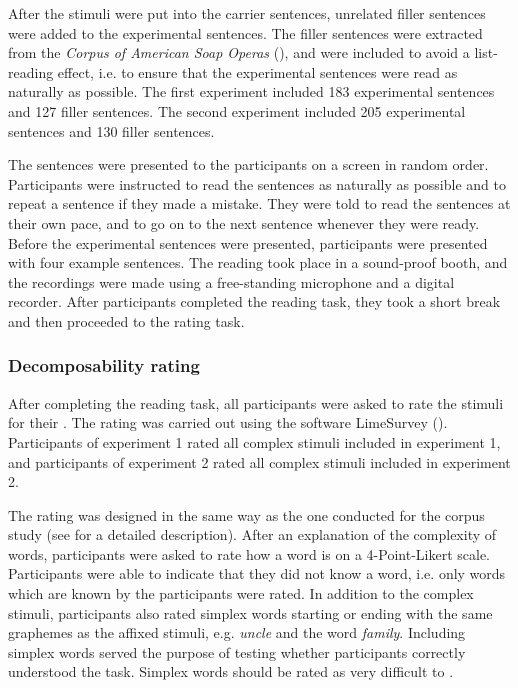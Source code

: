 
After the stimuli were put into the carrier sentences, unrelated filler sentences were added to the experimental sentences. The filler sentences were extracted from the \textit{Corpus of American Soap Operas} (\citealt{Davies.2011}), and were included  to avoid a list-reading effect, i.e. to ensure that the experimental sentences were read as naturally as possible. The first experiment included 183 experimental sentences and 127 filler sentences. The second experiment included 205 experimental sentences and 130 filler sentences. 

The sentences were presented to the participants on a screen in random order. 
Participants were instructed to read the sentences as naturally as possible and to repeat a sentence if they made a mistake. They were told to read the sentences at their own pace, and to go on to the next sentence whenever they were ready. Before the experimental sentences were presented, participants were presented with four example sentences. 
The reading took place in a sound-proof booth, and the recordings were made using a free-standing microphone and a digital recorder.
 After participants completed the reading task, they took a short break and then proceeded to the rating task.




\subsubsection{Decomposability rating}


After completing the reading task, all participants were asked to rate the stimuli for their . The rating was carried out using the software LimeSurvey (\citealt{LimeSurveyProjectTeam.2015}). Participants of experiment 1 rated all complex stimuli included in experiment 1, and participants of experiment 2 rated all complex stimuli included in experiment 2. 

The rating was designed in the same way as the one conducted for the corpus study (see  for a detailed description). After an explanation of the complexity of words, participants were asked to rate how  a word is on a 4-Point-Likert scale. Participants were able to indicate that they did not know a word, i.e. only words which are known by the participants were rated. In addition to the complex stimuli, participants also rated simplex words starting or ending with the same graphemes as the affixed stimuli, e.g. \textit{{un}cle} and the word \textit{fami{ly}}. Including simplex words served the purpose of testing whether participants correctly understood the task. Simplex words should be rated as very difficult to . 





